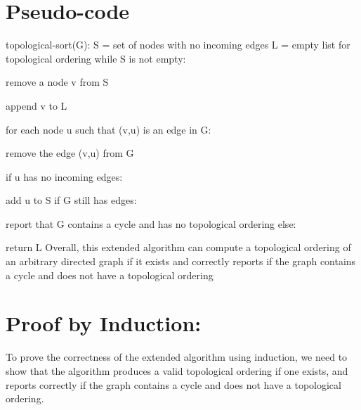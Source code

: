 \documentclass{article}
\begin{document}
\section*{\large Pseudo-code}
topological-sort(G):\newline
\newline S = set of nodes with no incoming edges\newline
\newline L = empty list for topological ordering\newline
\newline while S is not empty:\newline

remove a node v from S \newline

append v to L \newline

for each node u such that (v,u) is an edge in G: \newline

\quad remove the edge (v,u) from G \newline


\quad if u has no incoming edges: \newline


\qquad add u to S \newline
\newline if G still has edges:\newline

report that G contains a cycle and has no topological ordering\newline 
\newline else: \newline

return L\newline
\newline Overall, this extended algorithm can compute a topological ordering of an arbitrary directed graph if it exists and correctly reports if the graph contains a cycle and does not have a topological ordering

\section*{\huge Proof by Induction: }

To prove the correctness of the extended algorithm using induction, we need to show that the algorithm produces a valid topological ordering if one exists, and reports correctly if the graph contains a cycle and does not have a topological ordering.\newline
\end{document}
